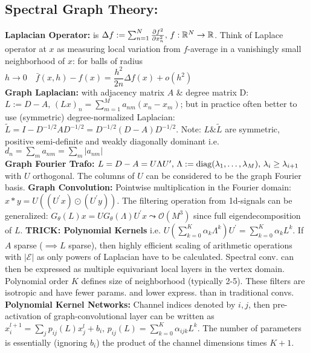\subsection{Spectral Graph Theory:}
\textbf{Laplacian Operator:} is \(\Delta f:= \sum_{n=1}^N \frac{\partial f^2}{\partial x_n^2}, \, f:\mathbb{R}^N \rightarrow \mathbb{R}\). Think of Laplace operator at \(x\) as measuring local variation from \(f\)-average in a vanishingly small neighborhood of \(x\): for balls of radius \(h\rightarrow 0 \quad \bar{f}(x,h)-f(x)=\dfrac{h^2}{2n}\Delta f(x) + o(h^2)\)\\
\textbf{Graph Laplacian: } with adjacency matrix \(A\) \& degree matrix D: \(L := D-A, \, (Lx)_n = \sum_{m=1}^M a_{nm}(x_n-x_m)\); but in practice often better to use (symmetric) degree-normalized Laplacian: \(\tilde{L}=I-D^{-1/2}AD^{-1/2}=D^{-1/2}(D-A)D^{-1/2}\). Note: \(L\& \tilde{L}\) are symmetric, positive semi-definite and weakly diagonally dominant i.e. \(d_n=\sum_m a_{nm}=\sum_m |a_{nm}|\) \\
\textbf{Graph Fourier Trafo:} \(L=D-A = U\Lambda U^{\prime}, \, \Lambda := \operatorname{diag}(\lambda_1, \ldots, \lambda_M), \, \lambda_i \geq \lambda_{i+1}\) with \(U\) orthogonal. The columns of \(U\) can be considered to be the graph Fourier basis.
\textbf{Graph Convolution: } Pointwise multiplication in the Fourier domain: \(x * y = U((U^{\prime}x) \odot (U^{\prime }y))\). The filtering operation from 1d-signals can be generalized: \(G_{\theta}(L)x = U G_{\theta}(\Lambda) U^{\prime}x \leadsto \mathcal{O}(M^3)\) since full eigendecomposition of \(L\). \textbf{TRICK: Polynomial Kernels} i.e. \(U\left(\sum_{k=0}^K \alpha_k \Lambda^k\right ) U^{\prime}=\sum_{k=0}^K \alpha_k L^k\). If \(A\) sparse (\(\implies L\) sparse), then highly efficient scaling of arithmetic operations with \(|\mathcal{E}|\) as only powers of Laplacian have to be calculated. Spectral conv. can then be expressed as multiple equivariant local layers in the vertex domain. Polynomial order \(K\) defines size of neighborhood (typically 2-5). These filters are isotropic and have fewer params. and lower express. than in traditional convs.\\
\textbf{Polynomial Kernel Networks:} Channel indices denoted by \(i, j\), then pre-activation of graph-convolutional layer can be written as \(x_i^{l+1}=\sum_j p_{ij}(L) x_j^l + b_i, \, p_{ij}(L) = \sum_{k=0}^K \alpha_{ijk}L^k.\) The number of parameters is essentially (ignoring \(b_i\)) the product of the channel dimensions times \(K+1\).

